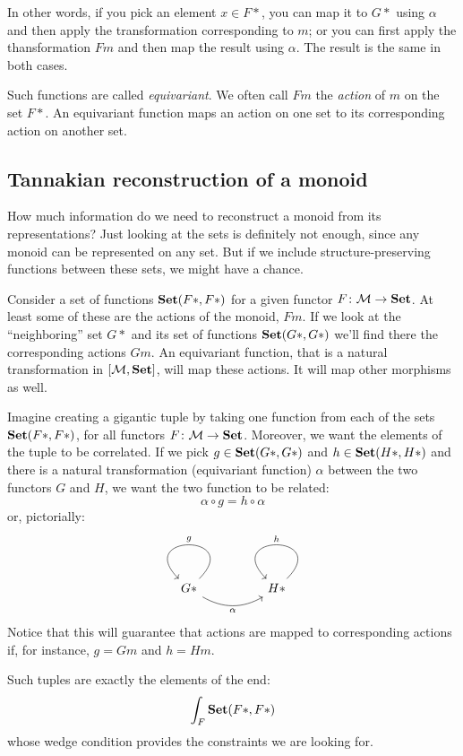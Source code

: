 \documentclass[DaoFP]{subfiles}
\begin{document}
In other words, if you pick an element $x \in F *$, you can map it to $G *$ using $\alpha$ and then apply the transformation corresponding to $m$; or you can first apply the thansformation $F m$ and then map the result using $\alpha$. The result is the same in both cases.

Such functions are called \emph{equivariant}. We often call $F m$ the \emph{action} of $m$ on the set $F *$. An equivariant function maps an action on one set to its corresponding action on another set. 

\subsection{Tannakian reconstruction of a monoid}

How much information do we need to reconstruct a monoid from its representations? Just looking at the sets is definitely not enough, since any monoid can be represented on any set. But if we include structure-preserving functions between these sets, we might have a chance. 

Consider a set of functions $\mathbf{Set}(F *, F *)$ for a given functor $F \colon \mathcal{M} \to \mathbf{Set}$. At least some of these are the actions of the monoid, $F m$. If we look at the ``neighboring'' set $G *$ and its set of functions  $\mathbf{Set}(G *, G *)$ we'll find there the corresponding actions $G m$. An equivariant function, that is a natural transformation in $[\mathcal{M}, \mathbf{Set}]$, will map these actions. It will map other morphisms as well.

Imagine creating a gigantic tuple by taking one function from each of the sets $\mathbf{Set} (F *, F *)$, for all functors $F\colon \mathcal{M} \to \mathbf{Set}$. Moreover, we want the elements of the tuple to be correlated. If we pick $g \in  \mathbf{Set} (G*, G *)$ and  $h \in  \mathbf{Set} (H*,  H*)$ and there is a natural transformation (equivariant function) $\alpha$ between the two functors $G$ and $H$, we want the two function to be related:
\[ \alpha \circ g = h \circ \alpha \]
or, pictorially:
\[
 \begin{tikzcd}
 G *
  \arrow[loop, "g"']
  \arrow[rr, bend right, "\alpha"']
 && H *
  \arrow[loop, "h"']
  \end{tikzcd}
\]
Notice that this will guarantee that actions are mapped to corresponding actions if, for instance, $g = G m$ and $h = H m$. 

Such tuples are exactly the elements of the end:
\[ \int_F \mathbf{Set}(F *, F *) \]
whose wedge condition provides the constraints we are looking for. 
\end{document}
